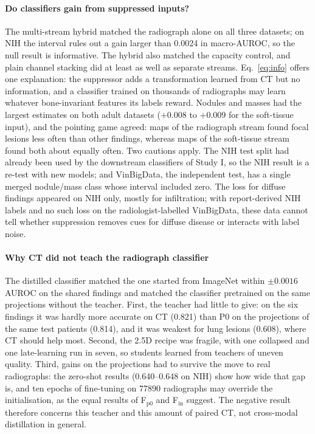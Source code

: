 \paragraph{Do classifiers gain from suppressed inputs?} The multi-stream hybrid matched the radiograph alone on all three datasets; on NIH the
interval rules out a gain larger than 0.0024 in macro-AUROC, so the null result is informative. The hybrid also matched the capacity
control, and plain channel stacking did at least as well as separate streams. Eq.~\eqref{eq:info} offers one explanation: the suppressor adds
a transformation learned from CT but no information, and a classifier trained on thousands of radiographs may learn whatever bone-invariant
features its labels reward. Nodules and masses had the largest estimates on both adult datasets ($+0.008$ to $+0.009$ for the soft-tissue
input), and the pointing game agreed: maps of the radiograph stream found focal lesions less often than other findings, whereas maps of the
soft-tissue stream found both about equally often. Two cautions apply. The NIH test split had already been used by the downstream classifiers
of Study I, so the NIH result is a re-test with new models; and VinBigData, the independent test, has a single merged nodule/mass class
whose interval included zero. The loss for diffuse findings appeared on NIH only, mostly for infiltration; with report-derived NIH labels
\citep{wang2017chestxray} and no such loss on the radiologist-labelled VinBigData, these data cannot tell whether suppression removes cues
for diffuse disease or interacts with label noise.

\paragraph{Why CT did not teach the radiograph classifier} The distilled classifier matched the one started from ImageNet within
$\pm0.0016$ AUROC on the shared findings and matched the classifier pretrained on the same projections without the teacher. First, the
teacher had little to give: on the six findings it was hardly more accurate on CT (0.821) than P0 on the projections of the same test
patients (0.814), and it was weakest for lung lesions (0.608), where CT should help most. Second, the 2.5D recipe was fragile, with one
collapsed and one late-learning run in seven, so students learned from teachers of uneven quality. Third, gains on the projections had to
survive the move to real radiographs: the zero-shot results (0.640--0.648 on NIH) show how wide that gap is, and ten epochs of fine-tuning on
\num{77890} radiographs may override the initialisation, as the equal results of F$_\mathrm{p0}$ and F$_\mathrm{in}$ suggest. The negative
result therefore concerns this teacher and this amount of paired CT, not cross-modal distillation in general.

